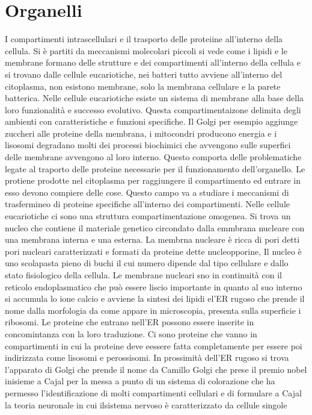\chapter{Organelli}
I compartimenti intrascellulari e il trasporto delle proteiine all'interno della cellula. Si \`e partiti da meccanismi molecolari piccoli si vede come i lipidi e le membrane formano delle
strutture e dei compartimenti all'interno della cellula e si trovano dalle cellule eucariotiche, nei batteri tutto avviene all'interno del citoplasma, non esistono membrane, solo 
la membrana cellulare e la parete batterica. Nelle cellule eucariotiche esiste un sistema di membrane alla base della loro funzionalit\`a e successo evolutivo. Questa compartimentaizone
delimita degli ambienti con caratteristiche e funzioni specifiche. Il Golgi per esempio aggiunge zuccheri alle proteine della membrana, i mitocondri producono energia e i lisosomi 
degradano molti dei processi biochimici che avvengono sulle superfici delle membrane avvengono al loro interno. Questo comporta delle problematiche legate al traporto delle proteine 
necessarie per il funzionamento dell'organello. Le protiene prodotte nel citoplasma per raggiungere il compartimento ed entrare in esso devono compiere delle cose. Questo campo va a 
studiare i meccanismi di trasfermineo di proteine specifiche all'interno dei compartimenti. Nelle cellule eucariotiche ci sono una struttura compartimentazione omogenea. Si trova un 
nucleo che contiene il materiale genetico circondato dalla emmbrana nucleare con una membrana interna e una esterna. La membrna nucleare \`e ricca di pori detti pori nucleari 
caratterizzati e formati da proteine dette nucleopporine, Il nucleo \`e uno scolapasta pieno di buchi il cui numero dipende dal tipo cellulare e dallo stato fisiologico della cellula.
Le membrane nucleari sno in continuit\`a con il reticolo endoplasmatico che pu\`o essere liscio importante in quanto al suo interno si accumula lo ione calcio e avviene la sintesi dei
lipidi el'ER rugoso che prende il nome dalla morfologia da come appare in microscopia, presenta sulla superficie i ribosomi. Le proteine che entrano nell'ER possono essere inserite in
concomintanza con la loro traduzione. Ci sono proteine che vanno in compartimenti in cui la proteine deve eessere fatta completamente per essere poi indirizzata come lisosomi e 
perossisomi. In prossimit\`a dell'ER rugoso si trova l'apparato di Golgi che prende il nome da Camillo Golgi che prese il premio nobel inisieme a Cajal per la messa a punto di un sistema
di colorazione che ha permesso l'identificazione di molti compartimenti cellulari e di formulare a Cajal la teoria neuronale in cui ilsistema nervoso \`e caratterizzato da cellule singole
